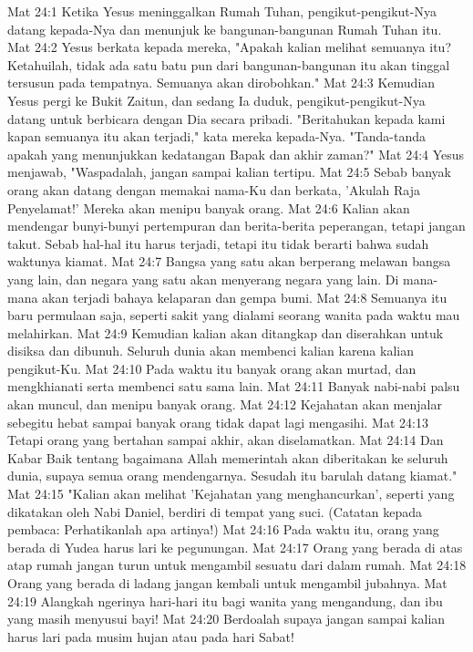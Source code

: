 Mat 24:1  Ketika Yesus meninggalkan Rumah Tuhan, pengikut-pengikut-Nya datang kepada-Nya dan menunjuk ke bangunan-bangunan Rumah Tuhan itu.
Mat 24:2  Yesus berkata kepada mereka, "Apakah kalian melihat semuanya itu? Ketahuilah, tidak ada satu batu pun dari bangunan-bangunan itu akan tinggal tersusun pada tempatnya. Semuanya akan dirobohkan."
Mat 24:3  Kemudian Yesus pergi ke Bukit Zaitun, dan sedang Ia duduk, pengikut-pengikut-Nya datang untuk berbicara dengan Dia secara pribadi. "Beritahukan kepada kami kapan semuanya itu akan terjadi," kata mereka kepada-Nya. "Tanda-tanda apakah yang menunjukkan kedatangan Bapak dan akhir zaman?"
Mat 24:4  Yesus menjawab, "Waspadalah, jangan sampai kalian tertipu.
Mat 24:5  Sebab banyak orang akan datang dengan memakai nama-Ku dan berkata, 'Akulah Raja Penyelamat!' Mereka akan menipu banyak orang.
Mat 24:6  Kalian akan mendengar bunyi-bunyi pertempuran dan berita-berita peperangan, tetapi jangan takut. Sebab hal-hal itu harus terjadi, tetapi itu tidak berarti bahwa sudah waktunya kiamat.
Mat 24:7  Bangsa yang satu akan berperang melawan bangsa yang lain, dan negara yang satu akan menyerang negara yang lain. Di mana-mana akan terjadi bahaya kelaparan dan gempa bumi.
Mat 24:8  Semuanya itu baru permulaan saja, seperti sakit yang dialami seorang wanita pada waktu mau melahirkan.
Mat 24:9  Kemudian kalian akan ditangkap dan diserahkan untuk disiksa dan dibunuh. Seluruh dunia akan membenci kalian karena kalian pengikut-Ku.
Mat 24:10  Pada waktu itu banyak orang akan murtad, dan mengkhianati serta membenci satu sama lain.
Mat 24:11  Banyak nabi-nabi palsu akan muncul, dan menipu banyak orang.
Mat 24:12  Kejahatan akan menjalar sebegitu hebat sampai banyak orang tidak dapat lagi mengasihi.
Mat 24:13  Tetapi orang yang bertahan sampai akhir, akan diselamatkan.
Mat 24:14  Dan Kabar Baik tentang bagaimana Allah memerintah akan diberitakan ke seluruh dunia, supaya semua orang mendengarnya. Sesudah itu barulah datang kiamat."
Mat 24:15  "Kalian akan melihat 'Kejahatan yang menghancurkan', seperti yang dikatakan oleh Nabi Daniel, berdiri di tempat yang suci. (Catatan kepada pembaca: Perhatikanlah apa artinya!)
Mat 24:16  Pada waktu itu, orang yang berada di Yudea harus lari ke pegunungan.
Mat 24:17  Orang yang berada di atas atap rumah jangan turun untuk mengambil sesuatu dari dalam rumah.
Mat 24:18  Orang yang berada di ladang jangan kembali untuk mengambil jubahnya.
Mat 24:19  Alangkah ngerinya hari-hari itu bagi wanita yang mengandung, dan ibu yang masih menyusui bayi!
Mat 24:20  Berdoalah supaya jangan sampai kalian harus lari pada musim hujan atau pada hari Sabat!
